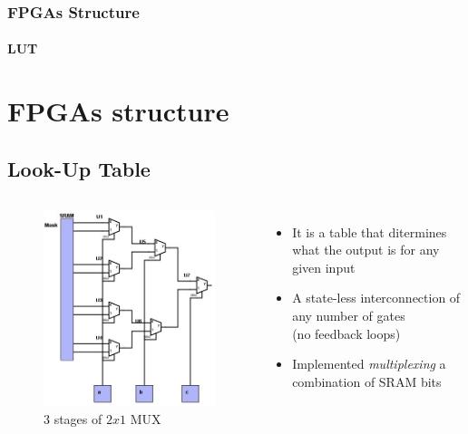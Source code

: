 \documentclass{beamer}
\begin{document}
\begin{frame}
\frametitle{FPGAs Structure}
\framesubtitle{LUT}
\section{FPGAs structure}
\subsection{Look-Up Table}


\begin{columns}[c]

\begin{figure}
\includegraphics[height=.75\textheight,left]{lutMux.jpg}
\caption{$3$ stages of $2x1$ MUX}
\end{figure}

\begin{itemize}
\item It is a \alert{table} that ditermines what the output is for any given input
\item A \alert{state-less} interconnection of any number of gates \\(no feedback loops)
\item Implemented \emph{multiplexing} a combination of SRAM bits 
\end{itemize}


\end{columns}

\end{frame}
\end{document}
